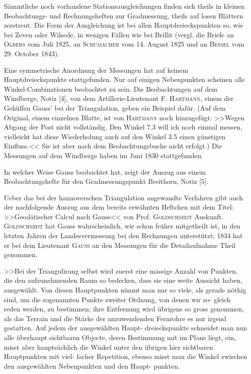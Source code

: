 \documentclass[12pt,a4paper]{article}
\theoremstyle{plain}
\theoremstyle{definition}
\theoremstyle{remark}
\begin{document}
S\"ammtliche noch vorhandene Stationsausgleichungen finden sich theils in kleinen Beobachtungs-
und Rechnungsheften zur Gradmessung, theils auf losen Bl\"attern zerstreut. Die Form der Ausgleichung ist
bei allen Hauptdreieckspunkten so, wie bei Zeven oder Wilsede, in wenigen F\"allen wie bei Brillit (vergl.
die Briefe an \textsc{Olbers} vom Juli 1825, an \textsc{Schumacher} vom 14. August 1825 und an \textsc{Bessel} vom
29. October 1843).

Eine symmetrische Anordnung der Messungen hat auf keinem Hauptdreieckspunkte stattgefunden.
Nur auf einigen Nebenpunkten scheinen alle Winkel-Combinationen beobachtet zu sein. Die Beobachtungen
auf dem Windberge, Notiz [4], von dem Artillerie-Lieutenant F. \textsc{Hartmann}, einem der Geh\"ulfen Gauss' bei
der Triangulation, geben ein Beispiel daf\"ur. (Auf dem Original, einem einzelnen Blatte, ist von \textsc{Hartmann}
noch hinzugef\"ugt: >>Wegen Abgang der Post nicht vollst\"andig. Den Winkel 7.3 will ich noch einmal
messen, vielleicht hat diese Wiederholung auch auf den Winkel 3.5 einen g\"unstigen Einfluss.<< Sie ist
aber nach dem Beobachtungsbuche nicht erfolgt.) Die Messungen auf dem Windberge haben im Juni 1830
stattgefunden.

In welcher Weise Gauss beobachtet hat, zeigt der Auszug aus einem Beobachtungshefte f\"ur den
Gradmessungspunkt Breithorn, Notiz [5].

Ueber das bei der hannoverschen Triangulation angewandte Verfahren gibt auch der nachfolgende
Auszug aus dem bereits erw\"ahnten Heftchen mit dem Titel: >>Geod\"atischer Calcul nach Gauss<< von Prof.
\textsc{Goldschmidt} Auskunft. \textsc{Goldschmidt} hat Gauss wahrscheinlich, wie schon fr\"uher mitgetheilt ist, in den
letzten Jahren der Landesvermessung bei den Rechnungen unterst\"utzt; 1834 hat er bei dem Lieutenant
\textsc{Gauss} an den Messungen f\"ur die Detailaufnahme Theil genommen.

>>Bei der Triangulirung selbst wird zuerst eine m\"assige Anzahl von Punkten, die den aufzunehmenden
Raum so bedecken, dass sie eine weite Aussicht haben, ausgew\"ahlt. Von diesen Hauptpunkten nimmt
man nur so viele, als gerade n\"othig sind, um die sogenannten Punkte zweiter Ordnung, von denen wir so-
gleich reden werden, zu bestimmen; ihre Entfernung wird \"ubrigens so gross genommen, als das Terrain und
die St\"arke der anzuwendenden Fernrohre es nur irgend gestatten. Auf jedem der ausgew\"ahlten Haupt-
dreieckspunkte schneidet man nun alle \"uberhaupt sichtbaren Objecte, deren Bestimmung mit im Plane
liegt, ein, misst aber haupts\"achlich die Winkel unter den \"ubrigen hier sichtbaren Hauptpunkten mit viel-
facher Repetition, ebenso misst man die Winkel zwischen den ausgew\"ahlten Nebenpunkten und den Haupt-
punkten.
\end{document}
